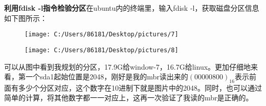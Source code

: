 \documentclass[]{report}
\begin{document}
	{\bf 利用fdisk -l指令检验分区}在ubuntu内的终端里，输入fdisk -l，获取磁盘分区信息如下图所示：
	
\begin{figure}[h!]
	\centering
	\texttt{[image: C:/Users/86181/Desktop/pictures/7]}
	\caption{}
	\label{fig:7}
\end{figure}

\begin{figure}[h!]
	\centering
	\texttt{[image: C:/Users/86181/Desktop/pictures/8]}
	\caption{}
	\label{fig:8}
\end{figure}

可以从图中看到我规划的分区，17.9G给window-7，16.7G给linux。更加仔细地来看，第一个sda1起始位置是2048，刚好是我的mbr读出来的$(00 00 08 00)_{16}$表示前面有多少个分区对应，这个数字在10进制下就是图片中的2048。同时，也可以通过简单的计算，将其他数字都一一对应上，这再一次验证了我读的mbr是正确的。
\end{document}
